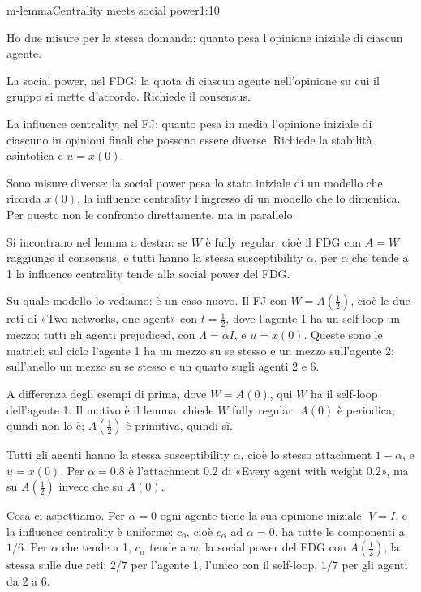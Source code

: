 \begin{slidedue}{m-lemma}{Centrality meets social power}{1:10}
  \begin{discorso}
    \item Ho due misure per la stessa domanda: quanto pesa l'opinione iniziale di ciascun agente.
    \item La social power, nel FDG: la quota di ciascun agente nell'opinione su cui il gruppo si mette d'accordo. Richiede il consensus.
    \item La influence centrality, nel FJ: quanto pesa in media l'opinione iniziale di ciascuno in opinioni finali che possono essere diverse. Richiede la stabilità asintotica e $u=x(0)$.
    \item Sono misure diverse: la social power pesa lo stato iniziale di un modello che ricorda $x(0)$, la influence centrality l'ingresso di un modello che lo dimentica. Per questo non le confronto direttamente, ma in parallelo.
    \item Si incontrano nel lemma a destra: se $W$ è fully regular, cioè il FDG con $A=W$ raggiunge il consensus, e tutti hanno la stessa susceptibility $\alpha$, per $\alpha$ che tende a 1 la influence centrality tende alla social power del FDG.
    \item \clic Su quale modello lo vediamo: è un caso nuovo. Il FJ con $W=A(\tfrac12)$, cioè le due reti di «Two networks, one agent» con $t=\tfrac12$, dove l'agente 1 ha un self-loop un mezzo; tutti gli agenti prejudiced, con $\Lambda=\alpha I$, e $u=x(0)$. Queste sono le matrici: sul ciclo l'agente 1 ha un mezzo su se stesso e un mezzo sull'agente 2; sull'anello un mezzo su se stesso e un quarto sugli agenti 2 e 6.
    \item A differenza degli esempi di prima, dove $W=A(0)$, qui $W$ ha il self-loop dell'agente 1. Il motivo è il lemma: chiede $W$ fully regular. $A(0)$ è periodica, quindi non lo è; $A(\tfrac12)$ è primitiva, quindi sì.
    \item Tutti gli agenti hanno la stessa susceptibility $\alpha$, cioè lo stesso attachment $1-\alpha$, e $u=x(0)$. Per $\alpha=0.8$ è l'attachment 0.2 di «Every agent with weight 0.2», ma su $A(\tfrac12)$ invece che su $A(0)$.
    \item Cosa ci aspettiamo. Per $\alpha=0$ ogni agente tiene la sua opinione iniziale: $V=I$, e la influence centrality è uniforme: $c_0$, cioè $c_\alpha$ ad $\alpha=0$, ha tutte le componenti a $1/6$. Per $\alpha$ che tende a 1, $c_\alpha$ tende a $w$, la social power del FDG con $A(\tfrac12)$, la stessa sulle due reti: $2/7$ per l'agente 1, l'unico con il self-loop, $1/7$ per gli agenti da 2 a 6.
  \end{discorso}
\end{slidedue}

